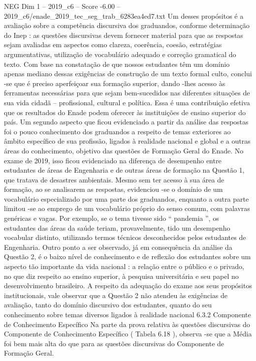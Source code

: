 \begin{textsample}{NEG Dim 1 – 2019\_c6 – Score -6.00 – 2019\_c6/enade\_2019\_tec\_seg\_trab\_6283ea4ed7.txt}
Um desses propósitos é a avaliação sobre a competência discursiva dos graduandos, conforme determinação do Inep : as questões discursivas devem fornecer material para que as respostas sejam avaliadas em aspectos como clareza, coerência, coesão, estratégias argumentativas, utilização de vocabulário adequado e correção gramatical do texto.
Com base na constatação de que nossos estudantes têm um domínio apenas mediano dessas exigências de construção de um texto formal culto, conclui -se que é preciso aperfeiçoar sua formação superior, dando -lhes acesso às ferramentas necessárias para que sejam bem-sucedidos nas diferentes situações de sua vida cidadã – profissional, cultural e política.
Essa é uma contribuição efetiva que os resultados do Enade podem oferecer às instituições de ensino superior do país.
Um segundo aspecto que ficou evidenciado a partir da análise das respostas foi o pouco conhecimento dos graduandos a respeito de temas exteriores ao âmbito específico de sua profissão, ligados à realidade nacional e global e a outras áreas do conhecimento, objetivo das questões de Formação Geral do Enade.
No exame de 2019, isso ficou evidenciado na diferença de desempenho entre estudantes de áreas de Engenharia e de outras áreas de formação na Questão 1, que tratava de desastres ambientais.
Mesmo sem ter acesso à sua área de formação, ao se analisarem as respostas, evidenciou -se o domínio de um vocabulário especializado por uma parte dos graduandos, enquanto a outra parte limitou -se ao emprego de um vocabulário próprio do senso comum, com palavras genéricas e vagas.
Por exemplo, se o tema tivesse sido “ pandemia ”, os estudantes das áreas da saúde teriam, provavelmente, tido um desempenho vocabular distinto, utilizando termos técnicos desconhecidos pelos estudantes de Engenharia.
Outro ponto a ser observado, já em consequência da análise da Questão 2, é o baixo nível de conhecimento e de reflexão dos estudantes sobre um aspecto tão importante da vida nacional : a relação entre o público e o privado, no que diz respeito ao ensino superior, à pesquisa universitária e seu papel no desenvolvimento brasileiro.
A respeito da adequação do exame aos seus propósitos institucionais, vale observar que a Questão 2 não atendeu às exigências de avaliação, tanto do domínio discursivo dos estudantes, quanto do seu conhecimento sobre temas diversos ligados à realidade nacional 6.3.2 Componente de Conhecimento Específico Na parte da prova relativa às questões discursivas do Componente de Conhecimento Específico ( Tabela 6.18 ), observa -se que a Média foi bem mais alta do que para as questões discursivas do Componente de Formação Geral.

\end{textsample}
